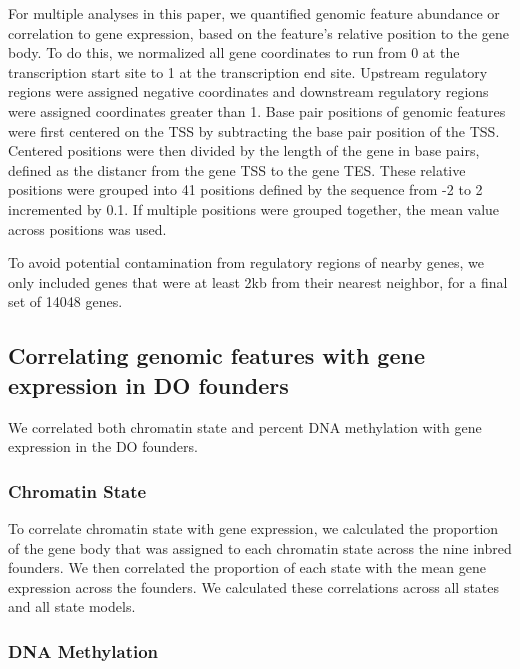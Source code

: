 \documentclass[10pt,letterpaper]{article}
\begin{document}
For multiple analyses in this paper, we quantified genomic feature
abundance or correlation to gene expression, based on the feature's
relative position to the gene body. To do this, we normalized all gene
coordinates to run from 0 at the transcription start site to 1 at the
transcription end site. Upstream regulatory regions were assigned
negative coordinates and downstream regulatory regions were assigned
coordinates greater than 1. Base pair positions of genomic features were
first centered on the TSS by subtracting the base pair position of the
TSS. Centered positions were then divided by the length of the gene in
base pairs, defined as the distancr from the gene TSS to the gene TES.
These relative positions were grouped into 41 positions defined by the
sequence from -2 to 2 incremented by 0.1. If multiple positions were
grouped together, the mean value across positions was used.

To avoid potential contamination from regulatory regions of nearby
genes, we only included genes that were at least 2kb from their nearest
neighbor, for a final set of 14048 genes.

\hypertarget{correlating-genomic-features-with-gene-expression-in-do-founders}{%
\subsection{Correlating genomic features with gene expression in DO
founders}\label{correlating-genomic-features-with-gene-expression-in-do-founders}}

We correlated both chromatin state and percent DNA methylation with gene
expression in the DO founders.

\hypertarget{chromatin-state}{%
\subsubsection{Chromatin State}\label{chromatin-state}}

To correlate chromatin state with gene expression, we calculated the
proportion of the gene body that was assigned to each chromatin state
across the nine inbred founders. We then correlated the proportion of
each state with the mean gene expression across the founders. We
calculated these correlations across all states and all state models.

\hypertarget{dna-methylation}{%
\subsubsection{DNA Methylation}\label{dna-methylation}}
\end{document}
